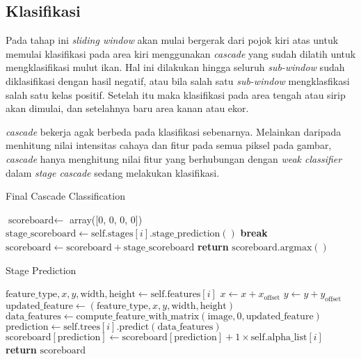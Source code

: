 \subsection{Klasifikasi} 

Pada tahap ini \textit{sliding window} akan mulai bergerak dari pojok kiri atas 
untuk memulai klasifikasi pada area kiri menggunakan \textit{cascade} 
yang sudah dilatih untuk mengklasifikasi mulut ikan. Hal ini dilakukan hingga 
seluruh \textit{sub-window} sudah diklasifikasi dengan hasil negatif, 
atau bila salah satu \textit{sub-window} mengklasfikasi salah satu kelas 
positif. Setelah itu maka klasifikasi pada area tengah atau sirip akan dimulai, dan 
setelahnya baru area kanan atau ekor.

\textit{cascade} bekerja agak berbeda pada klasifikasi sebenarnya. 
Melainkan daripada menhitung nilai intensitas cahaya dan fitur pada semua piksel 
pada gambar, \textit{cascade} hanya menghitung nilai fitur yang berhubungan 
dengan \textit{weak classifier} dalam \textit{stage cascade} sedang 
melakukan klasifikasi.

\begin{algorithm}
  \caption{Final Cascade Classification}
  \begin{algorithmic}[1]
      \State $\text{scoreboard} \gets$ array([0, 0, 0, 0])
        \State $\text{stage\_scoreboard} \gets \text{self.stages}[i].\text{stage\_prediction}()$
         \textbf{break}
        \Else \State $\text{scoreboard} \gets \text{scoreboard} + \text{stage\_scoreboard}$ \EndIf
      \EndFor
      \State \textbf{return} $\text{scoreboard}.\text{argmax}()$
    \EndFunction
  \end{algorithmic}
\end{algorithm}

\begin{algorithm}
  \caption{Stage Prediction}
  \begin{algorithmic}[1]
        \State $\text{feature\_type}, x, y, \text{width}, \text{height} \gets \text{self.features}[i]$
        \State $x \gets x + x_{\text{offset}}$
        \State $y \gets y + y_{\text{offset}}$
        \State $\text{updated\_feature} \gets (\text{feature\_type}, x, y, \text{width}, \text{height})$
        \State $\text{data\_features} \gets \text{compute\_feature\_with\_matrix}(\text{image}, 0, \text{updated\_feature})$
        \State $\text{prediction} \gets \text{self.trees}[i].\text{predict}(\text{data\_features})$
        \State $\text{scoreboard}[\text{prediction}] \gets \text{scoreboard}[\text{prediction}] + 1 \times \text{self.alpha\_list}[i]$
      \EndFor
      \State \textbf{return} $\text{scoreboard}$
    \EndFunction
  \end{algorithmic}
\end{algorithm}

